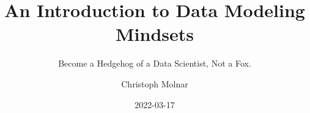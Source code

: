 \documentclass[
  10pt,
]{scrbook}
\title{An Introduction to Data Modeling Mindsets}
\subtitle{Become a Hedgehog of a Data Scientist, Not a Fox.}
\author{Christoph Molnar}
\date{2022-03-17}
\begin{document}
\maketitle

\thispagestyle{empty}

\end{document}
